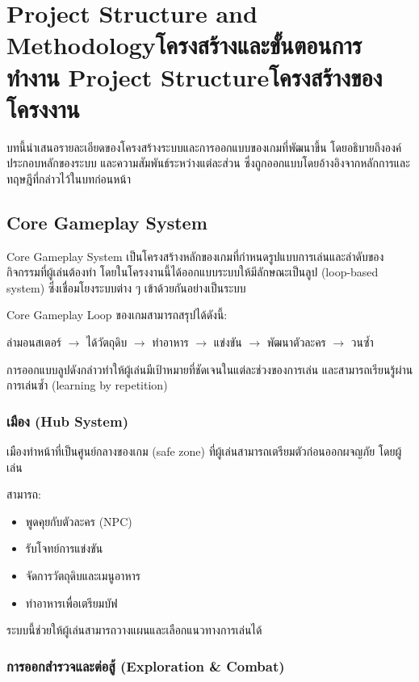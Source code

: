 \chapter{\ifproject%
\ifenglish Project Structure and Methodology\else โครงสร้างและขั้นตอนการทำงาน\fi
\else%
\ifenglish Project Structure\else โครงสร้างของโครงงาน\fi
\fi
}

บทนี้นำเสนอรายละเอียดของโครงสร้างระบบและการออกแบบของเกมที่พัฒนาขึ้น โดยอธิบายถึงองค์ประกอบหลักของระบบ และความสัมพันธ์ระหว่างแต่ละส่วน ซึ่งถูกออกแบบโดยอ้างอิงจากหลักการและทฤษฎีที่กล่าวไว้ในบทก่อนหน้า

\section{Core Gameplay System}

Core Gameplay System เป็นโครงสร้างหลักของเกมที่กำหนดรูปแบบการเล่นและลำดับของกิจกรรมที่ผู้เล่นต้องทำ โดยในโครงงานนี้ได้ออกแบบระบบให้มีลักษณะเป็นลูป (loop-based system) ซึ่งเชื่อมโยงระบบต่าง ๆ เข้าด้วยกันอย่างเป็นระบบ

Core Gameplay Loop ของเกมสามารถสรุปได้ดังนี้:

ล่ามอนสเตอร์ $\rightarrow$ ได้วัตถุดิบ $\rightarrow$ ทำอาหาร $\rightarrow$ แข่งขัน $\rightarrow$ พัฒนาตัวละคร $\rightarrow$ วนซ้ำ

\vspace{0.5em}
\noindent การออกแบบลูปดังกล่าวทำให้ผู้เล่นมีเป้าหมายที่ชัดเจนในแต่ละช่วงของการเล่น และสามารถเรียนรู้ผ่านการเล่นซ้ำ (learning by repetition)

\subsection{เมือง (Hub System)}

เมืองทำหน้าที่เป็นศูนย์กลางของเกม (safe zone) ที่ผู้เล่นสามารถเตรียมตัวก่อนออกผจญภัย โดยผู้เล่น \par

\noindent สามารถ:

\begin{itemize}
\item พูดคุยกับตัวละคร (NPC)
\item รับโจทย์การแข่งขัน
\item จัดการวัตถุดิบและเมนูอาหาร
\item ทำอาหารเพื่อเตรียมบัฟ
\end{itemize}
ระบบนี้ช่วยให้ผู้เล่นสามารถวางแผนและเลือกแนวทางการเล่นได้


\subsection{การออกสำรวจและต่อสู้ (Exploration \& Combat)}

